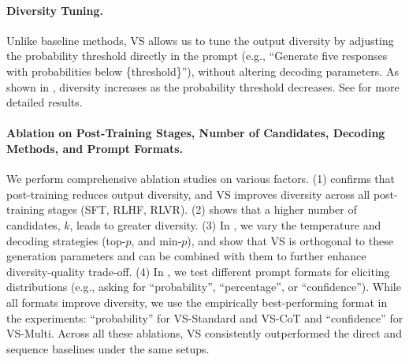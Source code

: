 \paragraph{Diversity Tuning.} Unlike baseline methods, VS allows us to tune the output diversity by adjusting the probability threshold directly in the prompt (e.g., ``Generate five responses with probabilities below \{threshold\}''), without altering decoding parameters. As shown in , diversity increases as the probability threshold decreases. See  for more detailed results.



\paragraph{Ablation on Post-Training Stages, Number of Candidates,  Decoding Methods, and Prompt Formats.} We perform comprehensive ablation studies on various factors. (1) 
 confirms that post-training  reduces output diversity, and VS improves diversity across all post-training stages (SFT, RLHF, RLVR). (2)  shows that a higher number of candidates, $k$, leads to greater diversity. (3) In , we vary the temperature and decoding strategies (top-$p$, and min-$p$), and show that VS is orthogonal to these generation parameters and can be combined with them to further enhance diversity-quality trade-off. 
(4) In , we test different prompt formats for eliciting distributions (e.g., asking for ``probability'', ``percentage'', or ``confidence''). While all formats improve diversity, we use the empirically best-performing format in the experiments: ``probability'' for VS-Standard and VS-CoT and ``confidence'' for VS-Multi. 
Across all these ablations, VS consistently outperformed the direct and sequence baselines under the same setups.

